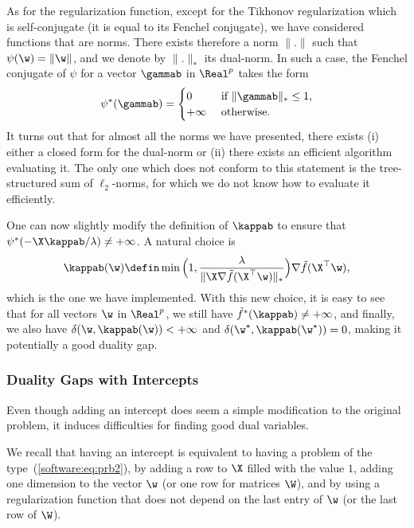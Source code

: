 \documentclass[a4paper, 11pt]{article}
\begin{document}
As for the regularization function, except for the Tikhonov regularization
which is self-conjugate (it is equal to its Fenchel conjugate), we have
considered functions that are norms. There exists therefore a norm $\|.\|$ such
that $\psi(\w)=\|\w\|$, and we denote by $\|.\|_\ast$ its dual-norm.  In such a
case, the Fenchel conjugate of $\psi$ for a vector $\gammab$ in $\Real^p$ takes the
form
\begin{displaymath}
   \psi^\ast(\gammab) = \begin{cases}
      0 &~\text{if}~ \|\gammab\|_\ast \leq 1, \\
      +\infty &~\text{otherwise}.
   \end{cases}
\end{displaymath}
It turns out that for almost all the norms we have presented, there exists (i)
either a closed form for the dual-norm or (ii) there exists an 
efficient algorithm evaluating it. The only one which does not conform to this
statement is the tree-structured sum of $\ell_2$-norms, for which we do not know
how to evaluate it efficiently.

One can now slightly modify the definition of $\kappab$
to ensure that $\psi^\ast(-\X\kappab/\lambda) \neq
+\infty$. A natural choice is
\begin{displaymath}
   \kappab(\w) \defin
\min\Big(1,\frac{\lambda}{\|\X\nabla\tilde{f}(\X^\top\w)\|_\ast}\Big)\nabla
\tilde{f}(\X^\top\w), 
\end{displaymath}
which is the one we have implemented.  With this new choice, it is easy to see
that for all vectors $\w$ in $\Real^p$, we still have $\tilde{f}^\ast(\kappab) \neq + \infty$, and
finally, we also have $\delta(\w,\kappab(\w)) < + \infty$ and
$\delta(\w^\star,\kappab(\w^\star))=0$, making it potentially a good
duality gap.

\subsubsection{Duality Gaps with Intercepts}
Even though adding an intercept does seem a simple modification to the original
problem, it induces difficulties for finding good dual variables.

We recall that having an intercept is equivalent to having a problem of the
type~(\ref{software:eq:prb2}), by adding a row to $\X$ filled with the value
$1$, adding one dimension to the vector $\w$ (or one row for matrices $\W$),
and by using a regularization function that does not depend on the last entry
of $\w$ (or the last row of $\W$).
\end{document}
